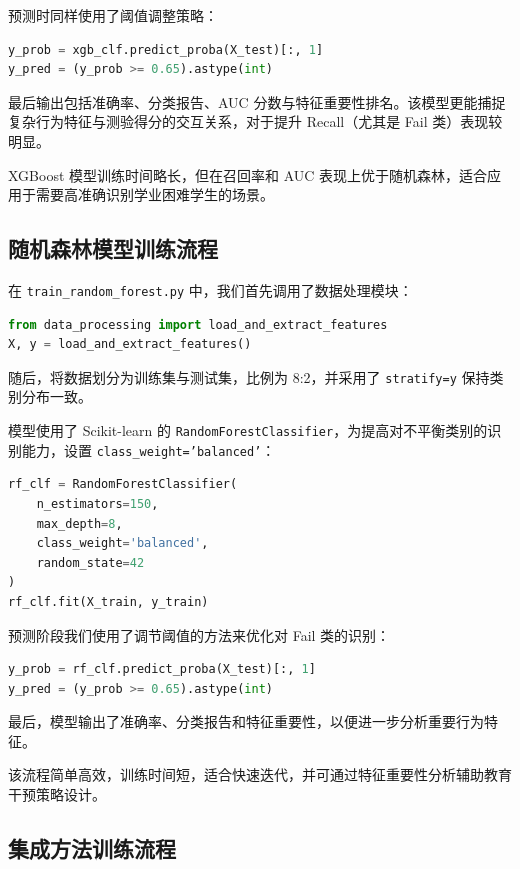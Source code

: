 \documentclass{SYSUReport}
\begin{document}
预测时同样使用了阈值调整策略：

\begin{lstlisting}[language=Python]
y_prob = xgb_clf.predict_proba(X_test)[:, 1]
y_pred = (y_prob >= 0.65).astype(int)
\end{lstlisting}

最后输出包括准确率、分类报告、AUC 分数与特征重要性排名。该模型更能捕捉复杂行为特征与测验得分的交互关系，对于提升 Recall（尤其是 Fail 类）表现较明显。

XGBoost 模型训练时间略长，但在召回率和 AUC 表现上优于随机森林，适合应用于需要高准确识别学业困难学生的场景。


\subsection{随机森林模型训练流程}

在 \texttt{train\_random\_forest.py} 中，我们首先调用了数据处理模块：

\begin{lstlisting}[language=Python]
from data_processing import load_and_extract_features
X, y = load_and_extract_features()
\end{lstlisting}

随后，将数据划分为训练集与测试集，比例为 8:2，并采用了 \texttt{stratify=y} 保持类别分布一致。

模型使用了 Scikit-learn 的 \texttt{RandomForestClassifier}，为提高对不平衡类别的识别能力，设置 \texttt{class\_weight='balanced'}：

\begin{lstlisting}[language=Python]
rf_clf = RandomForestClassifier(
    n_estimators=150,
    max_depth=8,
    class_weight='balanced',
    random_state=42
)
rf_clf.fit(X_train, y_train)
\end{lstlisting}

预测阶段我们使用了调节阈值的方法来优化对 Fail 类的识别：

\begin{lstlisting}[language=Python]
y_prob = rf_clf.predict_proba(X_test)[:, 1]
y_pred = (y_prob >= 0.65).astype(int)
\end{lstlisting}

最后，模型输出了准确率、分类报告和特征重要性，以便进一步分析重要行为特征。

该流程简单高效，训练时间短，适合快速迭代，并可通过特征重要性分析辅助教育干预策略设计。

\subsection{集成方法训练流程}
\end{document}
